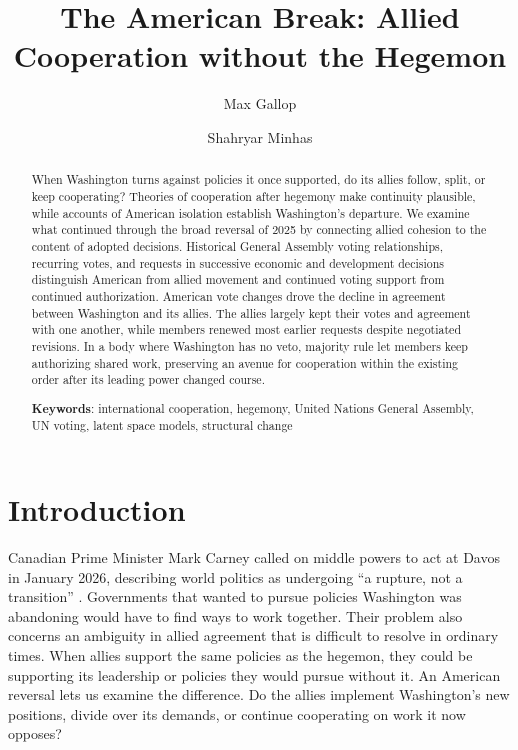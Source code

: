 \documentclass[12pt,authoryear]{elsarticle}
\begin{document}
\thispagestyle{empty}
\begin{frontmatter}

\title{The American Break: Allied Cooperation without the Hegemon}

\author[strath]{Max Gallop}
\author[msu]{Shahryar Minhas}
\address[strath]{Department of Government and Public Policy, University of Strathclyde}
\address[msu]{Department of Political Science, Michigan State University}

\begin{abstract}
\singlespacing
\noindent When Washington turns against policies it once supported, do its allies follow, split, or keep cooperating? Theories of cooperation after hegemony make continuity plausible, while accounts of American isolation establish Washington's departure. We examine what continued through the broad reversal of 2025 by connecting allied cohesion to the content of adopted decisions. Historical General Assembly voting relationships, recurring votes, and requests in successive economic and development decisions distinguish American from allied movement and continued voting support from continued authorization. American vote changes drove the decline in agreement between Washington and its allies. The allies largely kept their votes and agreement with one another, while members renewed most earlier requests despite negotiated revisions. In a body where Washington has no veto, majority rule let members keep authorizing shared work, preserving an avenue for cooperation within the existing order after its leading power changed course.

\vspace{3mm}
\noindent\textbf{Keywords}: international cooperation, hegemony, United Nations General Assembly, UN voting, latent space models, structural change
\end{abstract}
\end{frontmatter}

\newpage\setcounter{page}{1}
\doublespacing
\setlength{\parskip}{0pt}

\section{Introduction}

Canadian Prime Minister Mark Carney called on middle powers to act at Davos in January 2026, describing world politics as undergoing ``a rupture, not a transition'' \citep{carney:2026:davos}. Governments that wanted to pursue policies Washington was abandoning would have to find ways to work together. Their problem also concerns an ambiguity in allied agreement that is difficult to resolve in ordinary times. When allies support the same policies as the hegemon, they could be supporting its leadership or policies they would pursue without it. An American reversal lets us examine the difference. Do the allies implement Washington's new positions, divide over its demands, or continue cooperating on work it now opposes?
\end{document}
